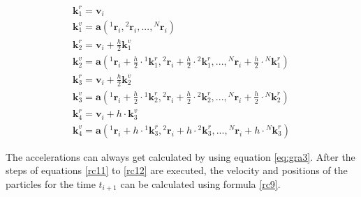 \documentclass[10pt,a4paper]{article}
\begin{document}
\begin{align}
\label{rc11}
\mathbf{k}_1^r = \mathbf{v}_i \\
\mathbf{k}_{1}^{v} = \mathbf{a}({}^{1}\mathbf{r}_i, {}^{2}\mathbf{r}_i,..., {}^{N}\mathbf{r}_i) \\
\mathbf{k}_2^r = \mathbf{v}_i + \frac{h}{2} \mathbf{k}_1^{v}	\\
\mathbf{k}_2^{v} = \mathbf{a}({}^{1}\mathbf{r}_i + \frac{h}{2}\cdot {}^{1}\mathbf{k}_1^r, {}^{2}\mathbf{r}_i + \frac{h}{2}\cdot {}^{2}\mathbf{k}_1^r,..., {}^{N}\mathbf{r}_i + \frac{h}{2}\cdot {}^{N}\mathbf{k}_1^r)	\\
\mathbf{k}_3^r = \mathbf{v}_i + \frac{h}{2} \mathbf{k}_2^v	\\
\mathbf{k}_3^{v} = \mathbf{a}({}^{1}\mathbf{r}_i + \frac{h}{2}\cdot {}^{1}\mathbf{k}_2^r, {}^{2}\mathbf{r}_i + \frac{h}{2}\cdot {}^{2}\mathbf{k}_2^r,..., {}^{N}\mathbf{r}_i + \frac{h}{2}\cdot {}^{N}\mathbf{k}_2^r)	\\
\mathbf{k}_4^r = \mathbf{v}_i + h \cdot \mathbf{k}_3^v	\\
\label{rc12}
\mathbf{k}_4^{v} = \mathbf{a}({}^{1}\mathbf{r}_i + h\cdot {}^{1}\mathbf{k}_3^r, {}^{2}\mathbf{r}_i + h\cdot {}^{2}\mathbf{k}_3^r,..., {}^{N}\mathbf{r}_i + h\cdot {}^{N}\mathbf{k}_3^r)
\end{align}

The accelerations can always get calculated by using equation \eqref{eq:gra3}. After the steps of equations \eqref{rc11} to \eqref{rc12} are executed, the velocity and positions of the particles for the time $t_{i+1}$ can be calculated using formula \eqref{rc9}.
\end{document}
